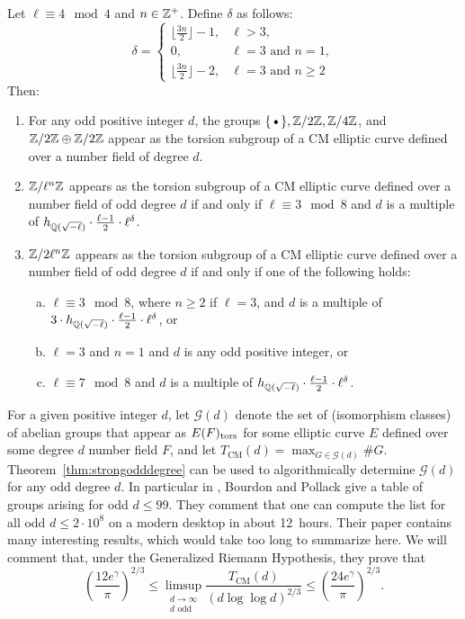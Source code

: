 \begin{thm} \label{thm:strongodddegree}
Let $\ell \equiv 4 \mod 4$ and $n \in \mathbb{Z}^+$. Define $\delta$ as follows:
	\[
	\delta= 
	\begin{cases}
	\lfloor \frac{3n}{2} \rfloor - 1, & \ell > 3, \\
	0, & \ell= 3 \text{ and } n= 1, \\
	\lfloor \frac{3n}{2} \rfloor - 2, & \ell= 3 \text{ and } n \geq 2
	\end{cases}
	\]
Then:
	\begin{enumerate}[(1)]
	\item For any odd positive integer $d$, the groups $\{ \text{\textbullet} \}, \Z/2\Z, \Z/4\Z$, and $\mathbb{Z}/2\mathbb{Z} \oplus \mathbb{Z}/2\mathbb{Z}$ appear as the torsion subgroup of a CM elliptic curve defined over a number field of degree $d$.
	\item $\mathbb{Z}/\ell^n\mathbb{Z}$ appears as the torsion subgroup of a CM elliptic curve defined over a number field of odd degree $d$ if and only if $\ell \equiv 3 \mod 8$ and $d$ is a multiple of $h_{\mathbb{Q}(\sqrt{-\ell})} \cdot \frac{\ell - 1}{2} \cdot \ell^\delta$.
	\item $\mathbb{Z}/2\ell^n\mathbb{Z}$ appears as the torsion subgroup of a CM elliptic curve defined over a number field of odd degree $d$ if and only if one of the following holds:
		\begin{enumerate}[(a)]
		\item $\ell \equiv 3 \mod 8$, where $n \geq 2$ if $\ell= 3$, and $d$ is a multiple of $3 \cdot h_{\mathbb{Q}(\sqrt{-\ell})} \cdot \frac{\ell - 1}{2} \cdot \ell^\delta$, or 
		\item $\ell= 3$ and $n= 1$ and $d$ is any odd positive integer, or
		\item $\ell \equiv 7 \mod 8$ and $d$ is a multiple of $h_{\mathbb{Q}(\sqrt{-\ell})} \cdot \frac{\ell - 1}{2} \cdot \ell^\delta$. 
		\end{enumerate}
	\end{enumerate}
\end{thm}


For a given positive integer $d$, let $\mathscr{G}(d)$ denote the set of (isomorphism classes) of abelian groups that appear as $E(F)_{\text{tors}}$ for some elliptic curve $E$ defined over some degree $d$ number field $F$, and let $T_{\text{CM}}(d)= \max_{G \in \mathscr{G}(d)} \#G$. Theorem~\ref{thm:strongodddegree} can be used to algorithmically determine $\mathscr{G}(d)$ for any odd degree $d$. In particular in \cite[Table~7]{bourdonpollack17}, Bourdon and Pollack give a table of groups arising for odd $d \leq 99$. They comment that one can compute the list for all odd $d \leq 2 \cdot 10^8$ on a modern desktop in about 12~hours. Their paper contains many interesting results, which would take too long to summarize here. We will comment that, under the Generalized Riemann Hypothesis, they prove that
	\[
	\left( \dfrac{12e^\gamma}{\pi} \right)^{2/3} \leq \limsup_{\substack{d \to \infty \\ d \text{ odd}}} \dfrac{T_{\text{CM}}(d)}{(d \log \log d)^{2/3}} \leq \left( \dfrac{24 e^\gamma}{\pi} \right)^{2/3}.
	\]


